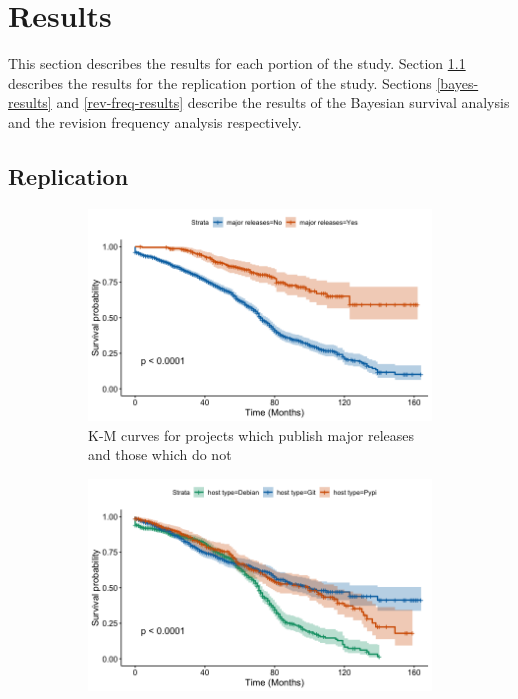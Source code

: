 \documentclass[sigconf,review]{acmart}
\begin{document}
\section{Results} \label{results}

This section describes the results for each portion of the study. 
Section \ref{repl-results} describes the results for the replication portion of the study. 
Sections \ref{bayes-results} and \ref{rev-freq-results} describe the results of the Bayesian survival analysis and the revision frequency analysis respectively.

\subsection{Replication} \label{repl-results}

\begin{figure}
    \centering
    \begin{subfigure}[b]{\columnwidth}
        \centering
        \includegraphics[width=\textwidth]{img/KM-major_release.jpg}
        \caption{\small K-M curves for projects which publish major releases and those which do not} 
        \label{fig:major_releases}
    \end{subfigure}
    \hfill
    \begin{subfigure}[b]{\columnwidth}
        \centering 
        \includegraphics[width=\textwidth]{img/KM-host_type.jpg}

\end{subfigure}
\end{figure}
\end{document}
